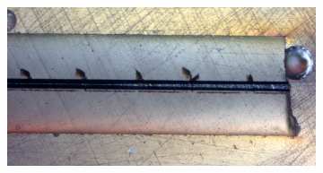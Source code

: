 \begin{figure}[h]
\begin{subfigure}{.7\textwidth}
  \centering
  \includegraphics[width=\linewidth]{fig/polishing/parallelcrack3.jpg}
  \label{fig:sfig3}
\end{subfigure}
\caption{}
\label{fig:si_sige}
\end{figure}

